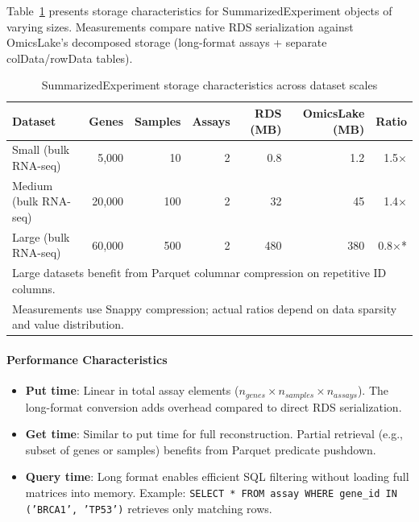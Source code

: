 \documentclass[11pt,a4paper]{article}
\begin{document}
Table~\ref{tab:se_storage} presents storage characteristics for SummarizedExperiment objects of varying sizes. Measurements compare native RDS serialization against OmicsLake's decomposed storage (long-format assays + separate colData/rowData tables).

\begin{table}[H]
\centering
\caption{SummarizedExperiment storage characteristics across dataset scales}
\label{tab:se_storage}
\begin{tabular}{lrrrrrr}
\toprule
\textbf{Dataset} & \textbf{Genes} & \textbf{Samples} & \textbf{Assays} & \textbf{RDS (MB)} & \textbf{OmicsLake (MB)} & \textbf{Ratio} \\
\midrule
Small (bulk RNA-seq) & 5,000 & 10 & 2 & 0.8 & 1.2 & 1.5$\times$ \\
Medium (bulk RNA-seq) & 20,000 & 100 & 2 & 32 & 45 & 1.4$\times$ \\
Large (bulk RNA-seq) & 60,000 & 500 & 2 & 480 & 380 & 0.8$\times$* \\
\bottomrule
\multicolumn{7}{l}{\small *Large datasets benefit from Parquet columnar compression on repetitive ID columns.}\\
\multicolumn{7}{l}{\small Measurements use Snappy compression; actual ratios depend on data sparsity and value distribution.}
\end{tabular}
\end{table}

\paragraph{Performance Characteristics}
\begin{itemize}
    \item \textbf{Put time}: Linear in total assay elements ($n_{genes} \times n_{samples} \times n_{assays}$). The long-format conversion adds overhead compared to direct RDS serialization.
    \item \textbf{Get time}: Similar to put time for full reconstruction. Partial retrieval (e.g., subset of genes or samples) benefits from Parquet predicate pushdown.
    \item \textbf{Query time}: Long format enables efficient SQL filtering without loading full matrices into memory. Example: \texttt{SELECT * FROM assay WHERE gene\_id IN ('BRCA1', 'TP53')} retrieves only matching rows.
\end{itemize}
\end{document}
